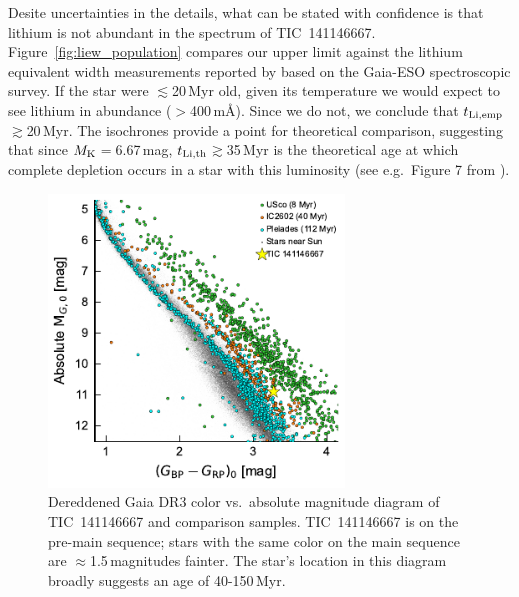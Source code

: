 \documentclass{nature3}
\begin{document}
\begin{methods}
Desite uncertainties in the details, what can be stated with
confidence is that lithium is not abundant in the spectrum of
TIC~141146667.  Figure~\ref{fig:liew_population} compares our upper
limit against the lithium equivalent width measurements reported by
\cite{Jeffries2023} based on the Gaia-ESO spectroscopic survey.  If
the star were $\lesssim$20\,Myr old, given its temperature we would
expect to see lithium in abundance ($>$400\,m\AA).  Since we do not,
we conclude that $t_{\rm Li,emp}$$\gtrsim$20\,Myr.  The
\cite{Feiden2016} isochrones provide a point for theoretical
comparison, suggesting that since $M_{\rm K}$$=$6.67\,mag, $t_{\rm
Li,th}$$\gtrsim$35\,Myr is the theoretical age at which complete
depletion occurs in a star with this luminosity (see e.g.~Figure 7
from \cite{Wood2023}).



\begin{figure}[!t]
  \centering
  \includegraphics[width=0.7\textwidth]{figures/sf3.pdf}
  \caption{Dereddened Gaia DR3 color vs.~absolute magnitude diagram of
  TIC~141146667 and comparison samples. 
  TIC~141146667 is on the pre-main sequence; stars with the same color
  on the main sequence are $\approx$1.5\,magnitudes
  fainter.  The star's location in this diagram broadly suggests an
  age of 40-150\,Myr.  }
  \label{fig:camd}
\end{figure}



\end{methods}
\end{document}
